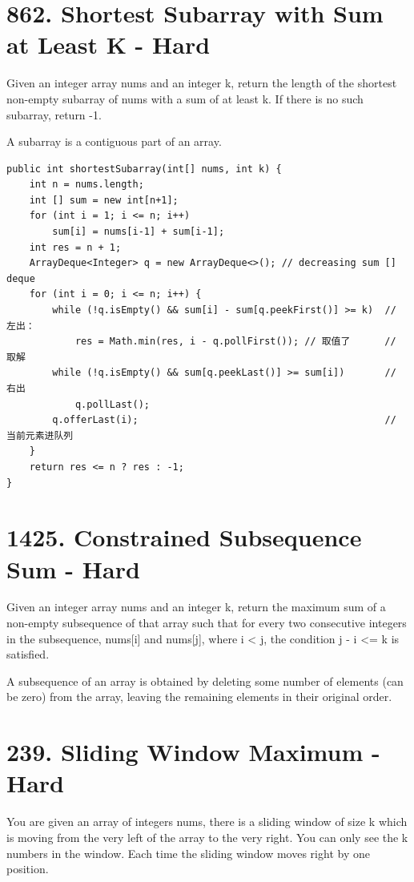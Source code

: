 \documentclass[9pt, b5paaper]{book}
\begin{document}
\section{862. Shortest Subarray with Sum at Least K - Hard}
\label{sec-1-2}
Given an integer array nums and an integer k, return the length of the shortest non-empty subarray of nums with a sum of at least k. If there is no such subarray, return -1.

A subarray is a contiguous part of an array.
\begin{verbatim}
public int shortestSubarray(int[] nums, int k) { 
    int n = nums.length;
    int [] sum = new int[n+1];  
    for (int i = 1; i <= n; i++)  
        sum[i] = nums[i-1] + sum[i-1];
    int res = n + 1;
    ArrayDeque<Integer> q = new ArrayDeque<>(); // decreasing sum [] deque
    for (int i = 0; i <= n; i++) {
        while (!q.isEmpty() && sum[i] - sum[q.peekFirst()] >= k)  // 左出：
            res = Math.min(res, i - q.pollFirst()); // 取值了      // 取解
        while (!q.isEmpty() && sum[q.peekLast()] >= sum[i])       // 右出
            q.pollLast();  
        q.offerLast(i);                                           // 当前元素进队列
    }
    return res <= n ? res : -1;
}
\end{verbatim}

\section{1425. Constrained Subsequence Sum - Hard}
\label{sec-1-3}
Given an integer array nums and an integer k, return the maximum sum of a non-empty subsequence of that array such that for every two consecutive integers in the subsequence, nums[i] and nums[j], where i < j, the condition j - i <= k is satisfied.

A subsequence of an array is obtained by deleting some number of elements (can be zero) from the array, leaving the remaining elements in their original order.

\section{239. Sliding Window Maximum - Hard}
\label{sec-1-4}
You are given an array of integers nums, there is a sliding window of size k which is moving from the very left of the array to the very right. You can only see the k numbers in the window. Each time the sliding window moves right by one position.
\end{document}
